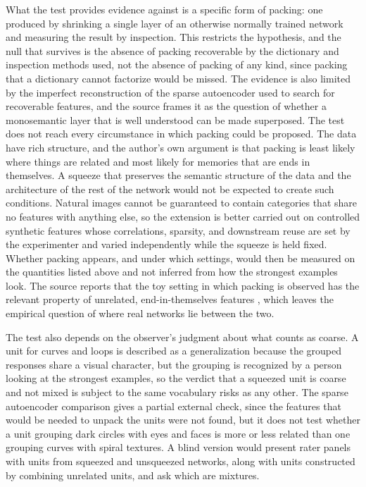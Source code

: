 \documentclass[11pt]{article}
\begin{document}
What the test provides evidence against is a specific form of packing: one produced by shrinking a single layer of an otherwise normally trained network and measuring the result by inspection. This restricts the hypothesis, and the null that survives is the absence of packing recoverable by the dictionary and inspection methods used, not the absence of packing of any kind, since packing that a dictionary cannot factorize would be missed. The evidence is also limited by the imperfect reconstruction of the sparse autoencoder used to search for recoverable features, and the source frames it as the question of whether a monosemantic layer that is well understood can be made superposed. The test does not reach every circumstance in which packing could be proposed. The data have rich structure, and the author's own argument is that packing is least likely where things are related and most likely for memories that are ends in themselves. A squeeze that preserves the semantic structure of the data and the architecture of the rest of the network would not be expected to create such conditions. Natural images cannot be guaranteed to contain categories that share no features with anything else, so the extension is better carried out on controlled synthetic features whose correlations, sparsity, and downstream reuse are set by the experimenter and varied independently while the squeeze is held fixed. Whether packing appears, and under which settings, would then be measured on the quantities listed above and not inferred from how the strongest examples look. The source reports that the toy setting in which packing is observed has the relevant property of unrelated, end-in-themselves features \cite[\emph{Toy Models}]{cammarata}, which leaves the empirical question of where real networks lie between the two.

The test also depends on the observer's judgment about what counts as coarse. A unit for curves and loops is described as a generalization because the grouped responses share a visual character, but the grouping is recognized by a person looking at the strongest examples, so the verdict that a squeezed unit is coarse and not mixed is subject to the same vocabulary risks as any other. The sparse autoencoder comparison gives a partial external check, since the features that would be needed to unpack the units were not found, but it does not test whether a unit grouping dark circles with eyes and faces is more or less related than one grouping curves with spiral textures. A blind version would present rater panels with units from squeezed and unsqueezed networks, along with units constructed by combining unrelated units, and ask which are mixtures.
\end{document}
